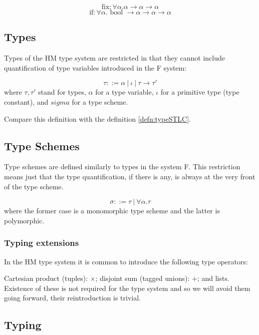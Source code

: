 $$\text{fix}: \forall \alpha . \alpha \rightarrow \alpha \rightarrow \alpha$$
$$\text{if}: \forall \alpha . \text{ bool } \rightarrow \alpha \rightarrow \alpha \rightarrow \alpha$$

\subsection{Types}

Types of the HM type system are restricted in that they cannot include quantification of type variables introduced in the F system:

\begin{defn}[Type]
    $$\tau ::= \alpha\ |\ \iota\ |\ \tau \rightarrow \tau'$$
    where $\tau, \tau'$ stand for types, $\alpha$ for a type variable, $\iota$ for a primitive type (type constant), and $sigma$ for a type scheme.
\end{defn}

Compare this definition with the definition \ref{defn:typeSTLC}.

\subsection{Type Schemes}

Type schemes are defined similarly to types in the system F. This restriction means just that the type quantification, if there is any, is always at the very front of the type scheme.

\begin{defn}
    \label{defn:schemeHM}
    $$\sigma ::= \tau\ |\ \forall \alpha . \tau$$
    where the former case is a monomorphic type scheme and the latter is polymorphic.
\end{defn}

\subsubsection{Typing extensions}
\label{sssec:typingExt}

In the HM type system it is common to introduce the following type operators:

Cartesian product (tuples): $\times$; disjoint sum (tagged unions): $+$; and lists. Existence of these is not required for the type system and so we will avoid them going forward, their reintroduction is trivial.

\subsection{Typing}

